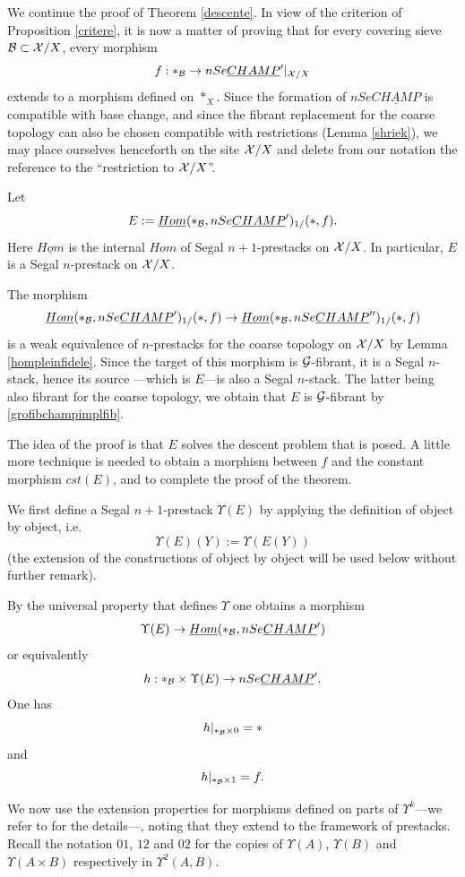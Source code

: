We continue the proof of Theorem \ref{descente}.
In view of the criterion of Proposition \ref{critere},
it is now a matter of proving that for every covering
sieve ${\cal B} \subset {\cal X} /X$, every
morphism
$$
f:\ast _{{\cal B}} \rightarrow nSe\underline{CHAMP}'|_{{\cal X} /X}
$$
extends to a morphism defined on $\ast _X$. Since the formation of
$nSe\underline{CHAMP}$ is compatible with base change, and since
the fibrant replacement for the coarse topology can also be
chosen compatible with restrictions (Lemma \ref{shriek}), we may place
ourselves henceforth on the site ${\cal X} /X$ and delete from our notation the
reference to the ``restriction
to ${\cal X}
/X$''.

Let $$
E:= \underline{Hom}(\ast _{{\cal B}},nSe\underline{CHAMP}')_{1/}(\ast , f).
$$
Here $\underline{Hom}$ is the internal $Hom$ of Segal $n+1$-prestacks on
${\cal X} /X$. In particular, $E$ is a Segal $n$-prestack on ${\cal X} /X$.

The morphism
$$
\underline{Hom}(\ast _{{\cal B}},nSe\underline{CHAMP}')_{1/}(\ast , f)
\rightarrow
\underline{Hom}(\ast _{{\cal B}},nSe\underline{CHAMP}'')_{1/}(\ast , f)
$$
is a weak equivalence of $n$-prestacks
for the coarse topology on
${\cal X} /X$ by Lemma \ref{hompleinfidele}. Since the target of this
morphism is
${\cal G}$-fibrant, it is a Segal $n$-stack, hence
its source
---which is $E$---is
also a Segal $n$-stack. The latter being also fibrant for the
coarse topology, we obtain that $E$ is ${\cal G}$-fibrant by
\ref{grofibchampimplfib}.

The idea of the proof is that $E$ solves the descent problem that is
posed. A little more technique is needed
to obtain a morphism
between $f$ and the constant morphism $cst(E)$, and
to complete the proof of the theorem.

We first define a Segal $n+1$-prestack $\Upsilon (E)$ by
applying the
definition of \cite{limits} object by object, i.e.
$$
\Upsilon (E)(Y):= \Upsilon (E(Y))
$$
(the extension of the constructions of \cite{limits} object by object will be used
below without further remark).

By the universal
property that defines $\Upsilon$ one obtains a morphism $$
\Upsilon (E)\rightarrow \underline{Hom}(\ast _{{\cal B}},nSe\underline{CHAMP}')
$$
or equivalently
$$
h: \ast _{{\cal B}} \times \Upsilon (E) \rightarrow nSe\underline{CHAMP}'.
$$
One has
$$
h|_{\ast _{{\cal B}} \times 0} = \ast
$$
and
$$
h|_{\ast _{{\cal B}} \times 1} = f.
$$

We now use the extension properties for morphisms defined
on parts of $\Upsilon ^k$---we
refer to \cite{limits} for the details---,
noting that they extend to the framework of prestacks.
Recall the notation $01$, $12$ and $02$ for the copies of $\Upsilon (A)$,
$\Upsilon (B)$ and $\Upsilon (A\times B)$ respectively in $\Upsilon ^2(A,B)$.


